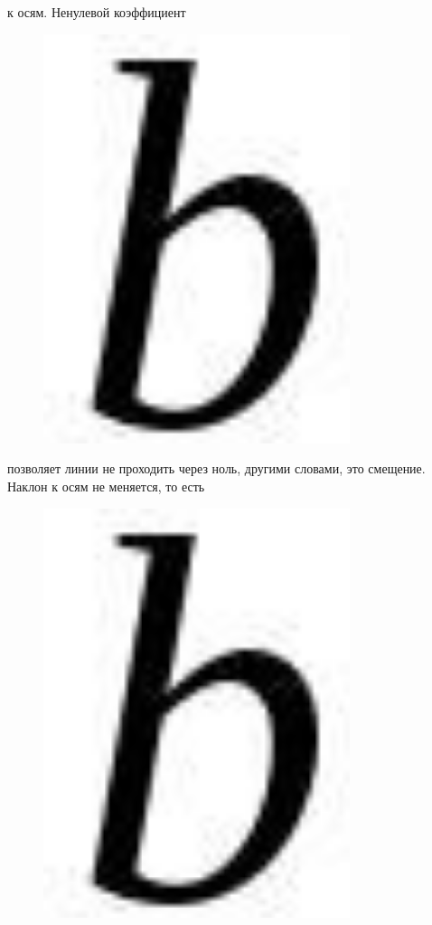 к осям. Ненулевой коэффициент \begin{figure}[H]
	\centering
	\includegraphics[width=0.8\textwidth]{assets/89}
	\caption*{}
\end{figure}
позволяет линии не проходить через ноль, другими словами, это смещение.
Наклон к осям не меняется, то есть \begin{figure}[H]
	\centering
	\includegraphics[width=0.8\textwidth]{assets/90}
	\caption*{}
\end{figure}
